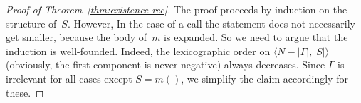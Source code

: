\documentclass[a4paper,numberwithinsect]{lipics-v2021}
\begin{document}
\begin{proof}[Proof of Theorem~\ref{thm:existence-rec}]
  The proof proceeds by induction on the structure of~$S$. However, In
  the case of a call the statement does not necessarily get smaller,
  because the body of~$m$ is expanded. So we need to argue that the
  induction is well-founded. Indeed, the lexicographic order on
  $\langle N-\left|\Gamma\right|,\left|S\right|\rangle$ (obviously,
  the first component is never negative) always decreases. Since
  $\Gamma$ is irrelevant for all cases except $S=m()$, we simplify the
  claim accordingly for these.

  

\end{proof}
\end{document}
